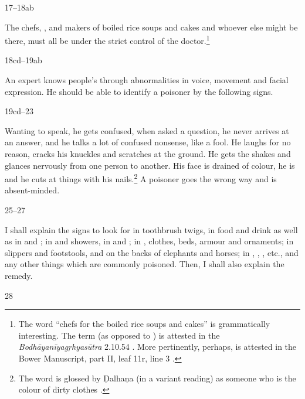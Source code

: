 \begin{translation}
\item[17--18ab]

The chefs, , and makers of boiled rice soups and cakes and whoever
else might be there, must all be under the strict control of the
doctor.\footnote{The word  “chefs for the boiled rice soups
and cakes” is grammatically interesting.  The term  (as opposed to
) is attested in the \emph{Bodhāyanīya\-gṛhyasūtra} 2.10.54 
\citep[68]{shas-1920}.  More pertinently, perhaps,  is attested in
the Bower Manuscript, part II, leaf 11r, line 3 \citep[vol.\,1,
p.\,43]{hoer-bowe}.} 

\item[18cd--19ab]

An expert  knows people's  
through abnormalities
in voice, movement and facial expression. He should be able to identify 
a poisoner by the following signs.


\item[19cd--23]

Wanting to speak, he gets confused, when asked a question, he never arrives at an
answer, and he talks a lot of confused nonsense, like a fool.  He laughs for no
reason, cracks his knuckles and scratches at the ground. He gets the shakes and
glances nervously from one person to another. His face is drained of colour, he is
 and he cuts at things with his nails.\footnote{The word
 is glossed by Ḍalhaṇa (in a variant reading) as someone who is the
colour of dirty clothes .}  A poisoner goes the wrong way and is
absent-minded.

\item[25--27]

I shall explain the signs to look for in toothbrush twigs, in food and drink as
well as in  and ; in
 and showers, in  and
; in , clothes, beds, 
armour
and ornaments; in slippers and footstools, and on the backs of elephants and
horses; in , , , etc., and any other things which are commonly poisoned. Then, I 
    shall
also explain the remedy.

\item[28]


\end{translation}

